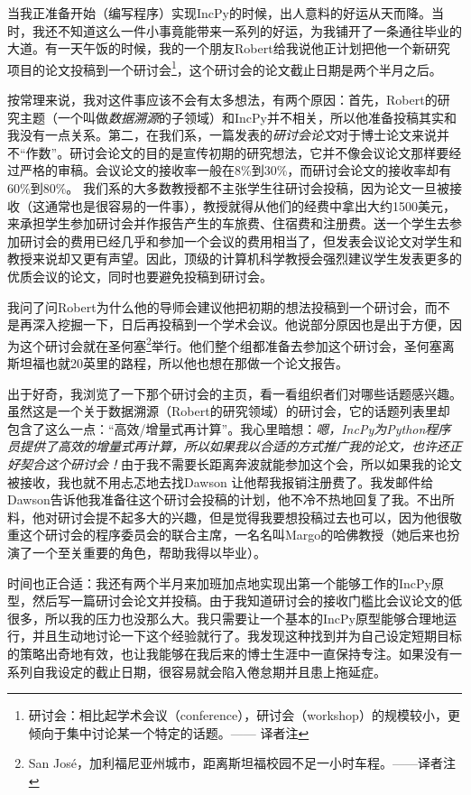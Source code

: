 \documentclass[12pt,UTF8,nofonts]{book}
\begin{document}
当我正准备开始（编写程序）实现IncPy的时候，出人意料的好运从天而降。当时，我还不知道这么一件小事竟能带来一系列的好运，为我铺开了一条通往毕业的大道。有一天午饭的时候，我的一个朋友Robert给我说他正计划把他一个新研究项目的论文投稿到一个研讨会\footnote{研讨会：相比起学术会议（conference），研讨会（workshop）的规模较小，更倾向于集中讨论某一个特定的话题。—— 译者注}，这个研讨会的论文截止日期是两个半月之后。

按常理来说，我对这件事应该不会有太多想法，有两个原因：首先，Robert的研究主题（一个叫做\emph{数据溯源}的子领域）和IncPy并不相关，所以他准备投稿其实和我没有一点关系。第二，在我们系，一篇发表的\emph{研讨会论文}对于博士论文来说并不“作数”。研讨会论文的目的是宣传初期的研究想法，它并不像会议论文那样要经过严格的审稿。会议论文的接收率一般在8\%到30\%，而研讨会论文的接收率却有60\%到80\%。 我们系的大多数教授都不主张学生往研讨会投稿，因为论文一旦被接收（这通常也是很容易的一件事），教授就得从他们的经费中拿出大约1500美元，来承担学生参加研讨会并作报告产生的车旅费、住宿费和注册费。送一个学生去参加研讨会的费用已经几乎和参加一个会议的费用相当了，但发表会议论文对学生和教授来说却又更有声望。因此，顶级的计算机科学教授会强烈建议学生发表更多的优质会议的论文，同时也要避免投稿到研讨会。

我问了问Robert为什么他的导师会建议他把初期的想法投稿到一个研讨会，而不是再深入挖掘一下，日后再投稿到一个学术会议。他说部分原因也是出于方便，因为这个研讨会就在圣何塞\footnote{San Jos\'e，加利福尼亚州城市，距离斯坦福校园不足一小时车程。——译者注}举行。他们整个组都准备去参加这个研讨会，圣何塞离斯坦福也就20英里的路程，所以他也想在那做一个论文报告。

出于好奇，我浏览了一下那个研讨会的主页，看一看组织者们对哪些话题感兴趣。虽然这是一个关于数据溯源（Robert的研究领域）的研讨会，它的话题列表里却包含了这么一点：“高效/增量式再计算”。我心里暗想：\emph{嗯，IncPy为Python程序员提供了高效的增量式再计算，所以如果我以合适的方式推广我的论文，也许还正好契合这个研讨会！}由于我不需要长距离奔波就能参加这个会，所以如果我的论文被接收，我也就不用忐忑地去找Dawson 让他帮我报销注册费了。我发邮件给Dawson告诉他我准备往这个研讨会投稿的计划，他不冷不热地回复了我。不出所料，他对研讨会提不起多大的兴趣，但是觉得我要想投稿过去也可以，因为他很敬重这个研讨会的程序委员会的联合主席，一名名叫Margo的哈佛教授（她后来也扮演了一个至关重要的角色，帮助我得以毕业）。

时间也正合适：我还有两个半月来加班加点地实现出第一个能够工作的IncPy原型，然后写一篇研讨会论文并投稿。由于我知道研讨会的接收门槛比会议论文的低很多，所以我的压力也没那么大。我只需要让一个基本的IncPy原型能够合理地运行，并且生动地讨论一下这个经验就行了。我发现这种找到并为自己设定短期目标的策略出奇地有效，也让我能够在我后来的博士生涯中一直保持专注。如果没有一系列自我设定的截止日期，很容易就会陷入倦怠期并且患上拖延症。
\end{document}

